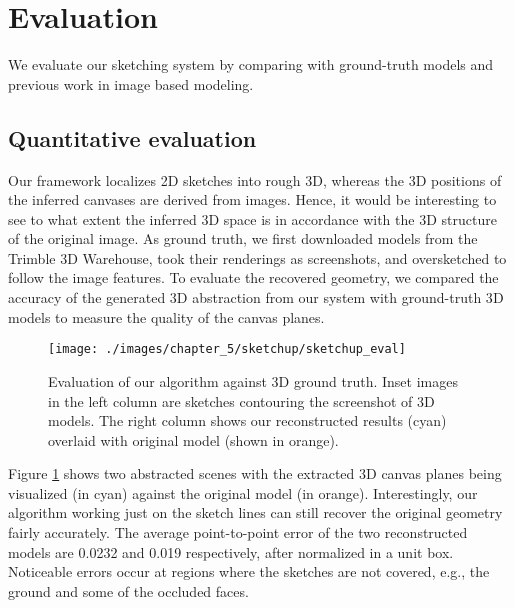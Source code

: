 \section{Evaluation}

We evaluate our sketching system by comparing with ground-truth models and previous work in image based modeling.

\subsection{Quantitative evaluation}  Our framework localizes 2{D} sketches into rough 3{D}, whereas the 3{D} positions of the inferred canvases are derived from images. Hence, it would be interesting to see to what extent the inferred 3{D} space is in accordance with the 3{D} structure of the original image. As ground truth, we first downloaded models from the Trimble 3D Warehouse, took their renderings as screenshots, and oversketched to follow the image features. To evaluate the recovered geometry, we compared the accuracy of the generated 3D abstraction from our system with ground-truth 3{D} models to measure the quality of the canvas planes.

\begin{figure}[t!]
  \texttt{[image: ./images/chapter\_5/sketchup/sketchup\_eval]}
  \caption[Evaluation of our algorithm against 3D ground truth.]{Evaluation of our algorithm against 3D ground truth. Inset images in the left column are sketches contouring the screenshot of 3{D} models. The right column shows our reconstructed results (cyan) overlaid with original model (shown in orange).}
  \label{fig:sketchupEval}
\end{figure}


Figure \ref{fig:sketchupEval} shows two abstracted scenes with the extracted 3D canvas planes being visualized (in cyan) against the original model (in orange). Interestingly, our algorithm working just on the sketch lines can still recover the original geometry fairly accurately. The average point-to-point error of the two reconstructed models are 0.0232 and 0.019 respectively, after normalized in a unit box.
Noticeable errors occur at regions where the sketches are not covered, e.g., the ground and some of the occluded faces.



